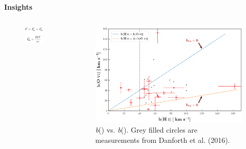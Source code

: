 \documentclass[aspectratio=169,draft]{beamer}
\newcommand\ion[2]{\text{#1\,\textsc{\lowercase{#2}}}}
\begin{document}
\begin{frame}[noframenumbering]{\huge{{\textbf{Insights}}}}

\begin{columns}
  \begin{column}{0.2\textwidth} 
    \vspace*{-8mm}
    \begin{figure}[!htbp]
      \centering
      \includegraphics[width=2.5cm]{Figures/b.png}
    \end{figure}
    
    
  \end{column}      

  \begin{column}{0.8\textwidth}

    \vspace*{-2mm}

    \begin{figure}[!htbp]
      \centering
      \includegraphics[width=9cm]{Figures/bHi_vs_BOvi_danforth.png}
      \vspace*{-1mm}
      \caption{\emph{b}(\ion{O}{vi}) vs. \emph{b}(\ion{H}{i}). Grey filled circles are measurements from Danforth et al. (2016).}
    \end{figure}
  \end{column}

\end{columns}



\end{frame}
\end{document}

